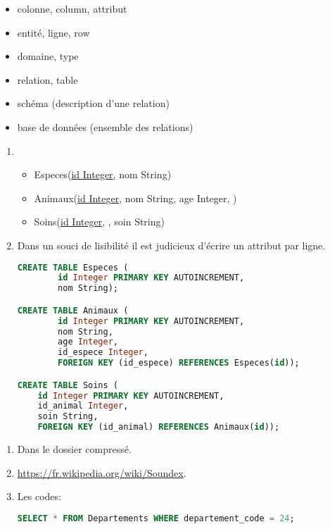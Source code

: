 \documentclass[a4paper,11pt]{article}
\begin{document}
\begin{Form}
\begin{exo}
\begin{itemize}
\item colonne, column, attribut
\item entité, ligne, row
\item domaine, type
\item relation, table
\item schéma (description d'une relation)
\item base de données (ensemble des relations)
\end{itemize}
\end{exo}
\begin{exo}
\begin{enumerate}
\item \begin{itemize}
\item Especes(\underline{id Integer}, nom String)
\item Animaux(\underline{id Integer}, nom String, age Integer, )
\item Soins(\underline{id Integer}, , soin String)
\end{itemize}
\item Dans un souci de lisibilité il est judicieux d'écrire un attribut par ligne.
\begin{center}
\begin{lstlisting}[language=SQL]
CREATE TABLE Especes (
		id Integer PRIMARY KEY AUTOINCREMENT, 
		nom String);

CREATE TABLE Animaux (
		id Integer PRIMARY KEY AUTOINCREMENT, 
		nom String, 
		age Integer, 
		id_espece Integer, 
		FOREIGN KEY (id_espece) REFERENCES Especes(id));

CREATE TABLE Soins (
	id Integer PRIMARY KEY AUTOINCREMENT, 
	id_animal Integer, 
	soin String,
	FOREIGN KEY (id_animal) REFERENCES Animaux(id));
\end{lstlisting}
\label{moncode}
\end{center}
\end{enumerate}
\end{exo}
\begin{exo}
\begin{enumerate}
\item Dans le dossier compressé.
\item \url{https://fr.wikipedia.org/wiki/Soundex}.
\item Les codes:
\begin{center}
\begin{lstlisting}[language=SQL]
SELECT * FROM Departements WHERE departement_code = 24;


\end{lstlisting}
\end{center}
\end{enumerate}
\end{exo}
\end{Form}
\end{document}
